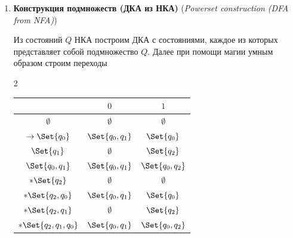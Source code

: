 \documentclass[12pt]{article}
\begin{document}
\begin{enumerate}
        \item \textbf{Конструкция подмножеств (ДКА из НКА)} (\textit{Powerset construction (DFA from NFA)})

        Из состояний $Q$ НКА построим ДКА с состояниями, каждое из которых представляет собой подмножество $Q$.
        Далее при помощи магии умным образом строим переходы

        \begin{multicols}{2}

            \smallvspace

            \begin{tabular}{c|cc}
                & $0$              & $1$              \\
                \hline
                $\emptyset$            & $\emptyset$      & $\emptyset$      \\
                \hline
                $\to\Set{q_0}$         & $\Set{q_0, q_1}$ & $\Set{q_0}$      \\
                \hline
                $\Set{q_1}$            & $\emptyset$      & $\Set{q_2}$      \\
                \hline
                $\Set{q_0, q_1}$       & $\Set{q_0, q_1}$ & $\Set{q_0, q_2}$ \\
                \hline
                $*\Set{q_2}$           & $\emptyset$      & $\emptyset$      \\
                \hline
                $*\Set{q_2, q_0}$      & $\Set{q_0, q_1}$ & $\Set{q_0}$      \\
                \hline
                $*\Set{q_2, q_1}$      & $\emptyset$      & $\Set{q_2}$      \\
                \hline
                $*\Set{q_2, q_1, q_0}$ & $\Set{q_0, q_1}$ & $\Set{q_0, q_2}$ \\
            \end{tabular}


\end{multicols}
\end{enumerate}
\end{document}
